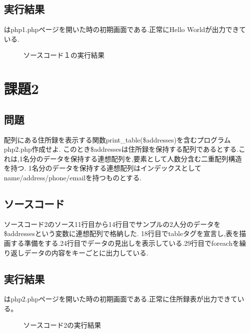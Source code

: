 \documentclass[a4j,10pt]{jsarticle}
\begin{document}
\subsection{実行結果}
はphp1.phpページを開いた時の初期画面である.正常にHello Worldが出力できている.

\begin{figure}[H]
  \centering
  \caption{ソースコード１の実行結果}
  \label{fig:1}
\end{figure}


\section{課題2}
\subsection{問題}

  配列にある住所録を表示する関数print\_table(\$addresses)を含むプログラムphp2.php作成せよ.
  このとき\$addressesは住所録を保持する配列であるとする.これは,1名分のデータを保持する連想配列を,要素として人数分含む二重配列構造を持つ.
  1名分のデータを保持する連想配列はインデックスとしてname/address/phone/emailを持つものとする.

\subsection{ソースコード}

ソースコード2のソース11行目から14行目でサンプルの2人分のデータを\$addressesという変数に連想配列で格納した.
18行目でtableタグを宣言し,表を描画する準備をする.24行目でデータの見出しを表示している.29行目でforeachを繰り返しデータの内容をキーごとに出力している.


\subsection{実行結果}

はphp2.phpページを開いた時の初期画面である.正常に住所録表が出力できている。

\begin{figure}[H]
  \centering
  \caption{ソースコード2の実行結果}
  \label{fig:2}
\end{figure}
\end{document}
